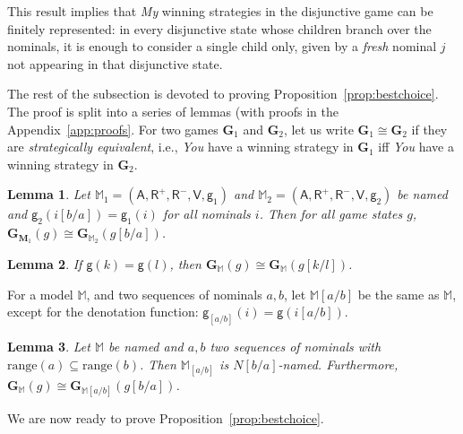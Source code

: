 \documentclass{easychair}
\newcommand{\You}{\emph{You}\xspace}
\newcommand{\My}{\emph{My}\xspace}
\newcommand{\A}{\mathsf{A}}
\newcommand{\R}{\mathsf{R}}
\newcommand{\V}{\mathsf{V}}
\newcommand{\g}{\mathsf{g}}
\newtheorem{lemma}{Lemma}
\begin{document}
This result implies that \My winning strategies in the disjunctive game can be
finitely represented: in every disjunctive state whose children branch over the
nominals, it is enough to consider a single child only, given by a \emph{fresh} nominal $j$
not appearing in that disjunctive state. 

 The rest of the subsection is devoted to proving
 Proposition~\ref{prop:bestchoice}. The proof is split 
 into a series of lemmas (with proofs in the Appendix~\ref{app:proofs}. For two games $\mathbf{G}_1$ and
 $\mathbf{G}_2$, let us write $\mathbf{G}_1\cong \mathbf{G}_2$ if they are
 \emph{strategically equivalent}, i.e., \You have a winning strategy in
 $\mathbf{G}_1$ iff \You  have a winning strategy in $\mathbf{G}_2$.


\begin{lemma}\label{lem:techicalnom}
Let $\mathbb{M}_1=(\A,\R^+,\R^-,\V,\g_1)$ and $\mathbb{M}_2=(\A,\R^+,\R^-,\V,\g_2)$ be named and $\g_2(i[b/a])=\g_1(i)$ for all nominals $i$. Then for all game states $g$, $\mathbf{G}_{\mathbf{M}_1}(g)\cong \mathbf{G}_{\mathbb{M}_2}(g[b/a])$.
\end{lemma}


\begin{lemma}\label{lem:samename}
If $\g(k) = \g(l)$, then $\mathbf{G}_\mathbb{M}(g)\cong\mathbf{G}_\mathbb{M}(g[k/l])$.
\end{lemma}



For a model $\mathbb{M}$, and two sequences of nominals $a,b$, let $\mathbb{M}[a/b]$ be the same as $\mathbb{M}$, except for the denotation function: $\g_{[a/b]}(i) = \g(i[a/b])$.

\begin{lemma}\label{lem:substsurj}
Let $\mathbb{M}$ be named and $a,b$ two sequences of nominals with $\mathrm{range}(a)\subseteq\mathrm{range}(b)$. Then $\mathbb{M}_{[a/b]}$ is $N[b/a]$-named. Furthermore, $\mathbf{G}_\mathbb{M}(g)\cong \mathbf{G}_{\mathbb{M}[a/b]}(g[b/a])$.
\end{lemma}



We are now ready to prove Proposition~\ref{prop:bestchoice}.
\end{document}
